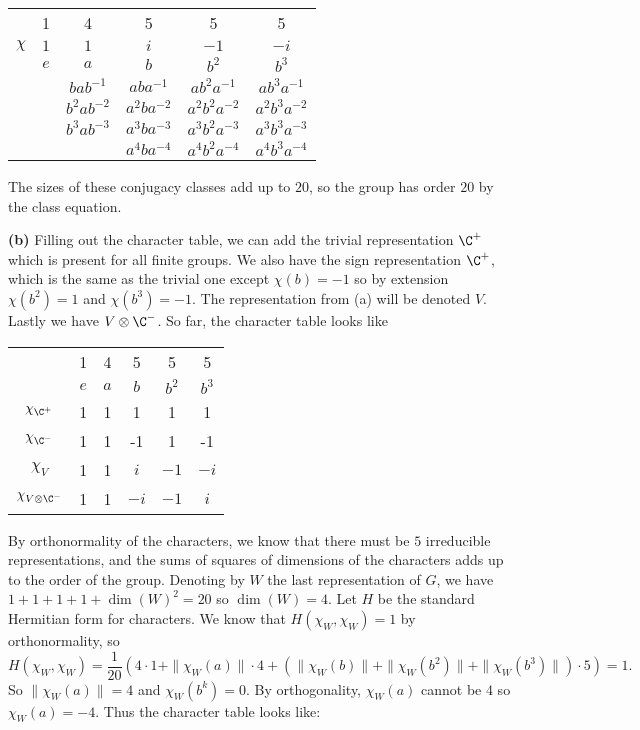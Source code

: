 \documentclass[11pt, letterpaper]{article}
\begin{document}
\begin{center}
    \begin{tabular}{ c|c|c|c|c|c| } 
        &1&4&5&5&5\\
        $\chi$& $1$& $1$& $i$& $-1$& $-i$\\
        \hline
        &$e$&$a$&$b$&$b^2$&$b^3$\\
        &&$bab^{-1}$&$aba^{-1}$ &$ab^2a^{-1}$ &$ab^3a^{-1}$ \\
        &&$b^2ab^{-2}$&$a^2ba^{-2}$ &$a^2b^2a^{-2}$ &$a^2b^3a^{-2}$ \\
        &&$b^3ab^{-3}$&$a^3ba^{-3}$ &$a^3b^2a^{-3}$ &$a^3b^3a^{-3}$ \\
        &&&$a^4ba^{-4}$&$a^4b^2a^{-4}$ &$a^4b^3a^{-4}$ \\
    \end{tabular}
\end{center}

The sizes of these conjugacy classes add up to $20$, so the group has order $20$ by the class equation.

\textbf{(b)} Filling out the character table, we can add the trivial representation $\C^+$ which is present for all finite groups. We also have the sign representation $\C^+$, which is the same as the trivial one except $\chi(b)=-1$ so by extension $\chi(b^2)=1$ and $\chi(b^3)=-1$. The representation from (a) will be denoted $V$. Lastly we have $V\otimes \C^-$. So far, the character table looks like

\begin{center}
    \begin{tabular}{c|c|c|c|c|c|}
        &1&4&5&5&5\\
        &$e$&$a$&$b$&$b^2$&$b^3$\\
        \hline
        $\chi_{\C^+}$&1&1&1&1&1\\
        $\chi_{\C^-}$&1&1&-1&1&-1\\
        $\chi_{V}$&1&1&$i$&$-1$&$-i$\\
        $\chi_{V\otimes \C^-}$&1&1&$-i$&$-1$&$i$\\
    \end{tabular}
\end{center}

By orthonormality of the characters, we know that there must be $5$ irreducible representations, and the sums of squares of dimensions of the characters adds up to the order of the group. Denoting by $W$ the last representation of $G$, we have $1+1+1+1+\dim(W)^2=20$ so $\dim(W)=4$. Let $H$ be the standard Hermitian form for characters. We know that $H(\chi_W, \chi_W)=1$ by orthonormality, so 
\[
    H(\chi_W, \chi_W) = \frac{1}{20}\left( 4\cdot 1 + \|\chi_W(a)\|\cdot 4 + (\|\chi_W(b)\| + \|\chi_W(b^2)\| + \|\chi_W(b^3)\|)\cdot 5\right) = 1
.\] 
So $\|\chi_W(a)\|=4$ and $\chi_W(b^k)=0$. By orthogonality, $\chi_W(a)$ cannot be $4$ so $\chi_W(a)=-4$. Thus the character table looks like: 
\end{document}
